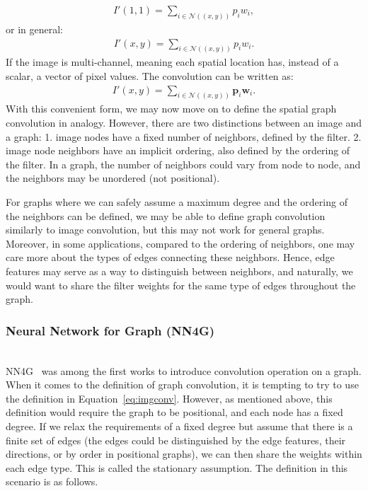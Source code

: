 \begin{gather}
I'(1, 1) = \sum_{i \in \mathcal {N}((x, y))} p_i w_i,
\end{gather}
or in general:
\begin{gather}
I'(x, y) = \sum_{i \in \mathcal {N}((x, y))} p_i w_i.
\end{gather}
If the image is multi-channel, meaning each spatial location has, instead of a scalar, a vector of pixel values. The convolution can be written as:
\begin{gather}
\label{eq:imgconv}
I'(x, y) = \sum_{i \in \mathcal {N}((x, y))} \mathbf{p}_i \mathbf{w}_i.
\end{gather}
With this convenient form, we may now move on to define the spatial graph convolution in analogy. However, there are two distinctions between an image and a graph: 1. image nodes have a fixed number of neighbors, defined by the filter. 2. image node neighbors have an implicit ordering, also defined by the ordering of the filter. In a graph, the number of neighbors could vary from node to node, and the neighbors may be unordered (not positional). 

For graphs where we can safely assume a maximum degree and the ordering of the neighbors can be defined, we may be able to define graph convolution similarly to image convolution, but this may not work for general graphs. Moreover, in some applications, compared to the ordering of neighbors, one may care more about the types of edges connecting these neighbors. Hence, edge features may serve as a way to distinguish between neighbors, and naturally, we would want to share the filter weights for the same type of edges throughout the graph. 





\subsubsection{Neural Network for Graph (NN4G)} \hfill \\
NN4G~\cite{nn4g} was among the first works to introduce convolution operation on a graph. When it comes to the definition of graph convolution, it is tempting to try to use the definition in Equation~\ref{eq:imgconv}. However, as mentioned above, this definition would require the graph to be positional, and each node has a fixed degree. If we relax the requirements of a fixed degree but assume that there is a finite set of edges (the edges could be distinguished by the edge features, their directions, or by order in positional graphs), we can then share the weights within each edge type. This is called the stationary assumption. The definition in this scenario is as follows.

